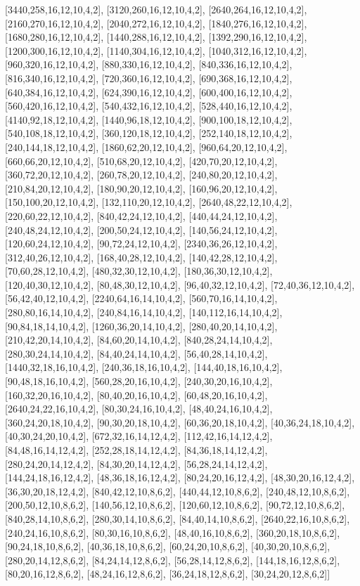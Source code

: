 \documentclass[12pt]{amsart}
\begin{document}
[3440,258,16,12,10,4,2],   [3120,260,16,12,10,4,2],   [2640,264,16,12,10,4,2],   [2160,270,16,12,10,4,2],   [2040,272,16,12,10,4,2],   [1840,276,16,12,10,4,2],
[1680,280,16,12,10,4,2],   [1440,288,16,12,10,4,2],   [1392,290,16,12,10,4,2],   [1200,300,16,12,10,4,2],   [1140,304,16,12,10,4,2],   [1040,312,16,12,10,4,2],
[960,320,16,12,10,4,2],   [880,330,16,12,10,4,2],   [840,336,16,12,10,4,2],   [816,340,16,12,10,4,2],   [720,360,16,12,10,4,2],   [690,368,16,12,10,4,2],
[640,384,16,12,10,4,2],   [624,390,16,12,10,4,2],   [600,400,16,12,10,4,2],   [560,420,16,12,10,4,2],   [540,432,16,12,10,4,2],   [528,440,16,12,10,4,2],
[4140,92,18,12,10,4,2],   [1440,96,18,12,10,4,2],   [900,100,18,12,10,4,2],   [540,108,18,12,10,4,2],   [360,120,18,12,10,4,2],   [252,140,18,12,10,4,2],
[240,144,18,12,10,4,2],   [1860,62,20,12,10,4,2],   [960,64,20,12,10,4,2],   [660,66,20,12,10,4,2],   [510,68,20,12,10,4,2],   [420,70,20,12,10,4,2],
[360,72,20,12,10,4,2],   [260,78,20,12,10,4,2],   [240,80,20,12,10,4,2],   [210,84,20,12,10,4,2],   [180,90,20,12,10,4,2],   [160,96,20,12,10,4,2],
[150,100,20,12,10,4,2],   [132,110,20,12,10,4,2],   [2640,48,22,12,10,4,2],   [220,60,22,12,10,4,2],   [840,42,24,12,10,4,2],   [440,44,24,12,10,4,2],
[240,48,24,12,10,4,2],   [200,50,24,12,10,4,2],   [140,56,24,12,10,4,2],   [120,60,24,12,10,4,2],   [90,72,24,12,10,4,2],   [2340,36,26,12,10,4,2],
[312,40,26,12,10,4,2],   [168,40,28,12,10,4,2],   [140,42,28,12,10,4,2],   [70,60,28,12,10,4,2],   [480,32,30,12,10,4,2],   [180,36,30,12,10,4,2],   [120,40,30,12,10,4,2],
[80,48,30,12,10,4,2],   [96,40,32,12,10,4,2],   [72,40,36,12,10,4,2],   [56,42,40,12,10,4,2],   [2240,64,16,14,10,4,2],   [560,70,16,14,10,4,2],   [280,80,16,14,10,4,2],
[240,84,16,14,10,4,2],   [140,112,16,14,10,4,2],   [90,84,18,14,10,4,2],   [1260,36,20,14,10,4,2],   [280,40,20,14,10,4,2],   [210,42,20,14,10,4,2],
[84,60,20,14,10,4,2],   [840,28,24,14,10,4,2],   [280,30,24,14,10,4,2],   [84,40,24,14,10,4,2],   [56,40,28,14,10,4,2],   [1440,32,18,16,10,4,2],   [240,36,18,16,10,4,2],
[144,40,18,16,10,4,2],   [90,48,18,16,10,4,2],   [560,28,20,16,10,4,2],   [240,30,20,16,10,4,2],   [160,32,20,16,10,4,2],   [80,40,20,16,10,4,2],   [60,48,20,16,10,4,2],
[2640,24,22,16,10,4,2],   [80,30,24,16,10,4,2],   [48,40,24,16,10,4,2],   [360,24,20,18,10,4,2],   [90,30,20,18,10,4,2],   [60,36,20,18,10,4,2],   [40,36,24,18,10,4,2],
[40,30,24,20,10,4,2],   [672,32,16,14,12,4,2],   [112,42,16,14,12,4,2],   [84,48,16,14,12,4,2],   [252,28,18,14,12,4,2],   [84,36,18,14,12,4,2],   [280,24,20,14,12,4,2],
[84,30,20,14,12,4,2],   [56,28,24,14,12,4,2],   [144,24,18,16,12,4,2],   [48,36,18,16,12,4,2],   [80,24,20,16,12,4,2],   [48,30,20,16,12,4,2],   [36,30,20,18,12,4,2],
[840,42,12,10,8,6,2],   [440,44,12,10,8,6,2],   [240,48,12,10,8,6,2],   [200,50,12,10,8,6,2],   [140,56,12,10,8,6,2],   [120,60,12,10,8,6,2],   [90,72,12,10,8,6,2],
[840,28,14,10,8,6,2],   [280,30,14,10,8,6,2],   [84,40,14,10,8,6,2],   [2640,22,16,10,8,6,2],   [240,24,16,10,8,6,2],   [80,30,16,10,8,6,2],   [48,40,16,10,8,6,2],
[360,20,18,10,8,6,2],   [90,24,18,10,8,6,2],   [40,36,18,10,8,6,2],   [60,24,20,10,8,6,2],   [40,30,20,10,8,6,2],   [280,20,14,12,8,6,2],   [84,24,14,12,8,6,2],
[56,28,14,12,8,6,2],   [144,18,16,12,8,6,2],   [80,20,16,12,8,6,2],   [48,24,16,12,8,6,2],   [36,24,18,12,8,6,2],   [30,24,20,12,8,6,2]]
\end{document}
